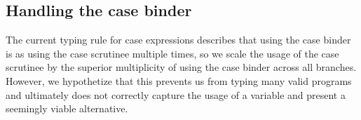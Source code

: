 \documentclass[a4paper, draft]{report}
\begin{document}






\subsection{Handling the case binder\label{casebinder}}

The current typing rule for case expressions describes that using the case
binder is as using the case scrutinee multiple times, so we scale the usage of
the case scrutinee by the superior multiplicity of using the case binder across
all branches. However, we hypothetize that this prevents us from typing many
valid programs and ultimately does not correctly capture the usage of a
variable and present a seemingly viable alternative.
\end{document}
